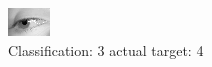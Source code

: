 \begin{figure}[h!]
\begin{center}
\includegraphics[width=0.60\columnwidth]{figures/ID3005_class_3_target_4.png}
\end{center}
\caption{ Classification: 3 actual target: 4}
\label{fig:ID3005_class_3_target_4}
\end{figure}
